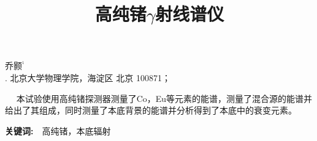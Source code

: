 \documentclass[a4paper,10.0pt,twoside]{npr}
\begin{document}
\setcounter{page}{001}%
\begin{center}
\title{%
\xiaoerhao \bf  %
高纯锗$\gamma$射线谱仪\\[-5mm]}
\maketitle
\large \fs
乔颢$^{^1}$\\[2mm]

\xiaowu {}. 北京大学物理学院，海淀区 北京 100871；\\[4mm]

 

\parbox{158mm} {
~~\fs
本试验使用高纯锗探测器测量了Co，Eu等元素的能谱，测量了混合源的能谱并给出了其组成，同时测量了本底背景的能谱并分析得到了本底中的衰变元素。

{\bf 关键词:}~~\fs 高纯锗，本底辐射}\\
\end{center}
\vspace{5mm}
\setcounter{section}{0}
\end{document}
